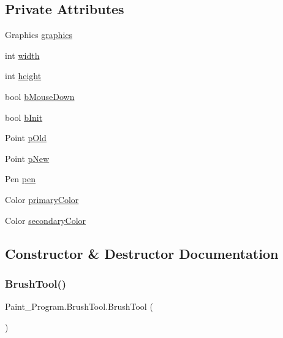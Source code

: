 \subsection*{Private Attributes}
\begin{DoxyCompactItemize}
\item 
Graphics \mbox{\hyperlink{class_paint___program_1_1_brush_tool_ada03533308b687fb5aad5a97e39a2418}{graphics}}
\item 
int \mbox{\hyperlink{class_paint___program_1_1_brush_tool_a2d11ac1381688670b77779849c220256}{width}}
\item 
int \mbox{\hyperlink{class_paint___program_1_1_brush_tool_a74fa3f15b3521feddeab58e5da3e794c}{height}}
\item 
bool \mbox{\hyperlink{class_paint___program_1_1_brush_tool_a38e63e44faf4b844b17525f6b64e166b}{b\+Mouse\+Down}}
\item 
bool \mbox{\hyperlink{class_paint___program_1_1_brush_tool_a3bf38746d897988af50ce9d863eaf70b}{b\+Init}}
\item 
Point \mbox{\hyperlink{class_paint___program_1_1_brush_tool_a2686971a90a27e64e904106fa8893841}{p\+Old}}
\item 
Point \mbox{\hyperlink{class_paint___program_1_1_brush_tool_a6d266f7303b546970257227c86dbacf7}{p\+New}}
\item 
Pen \mbox{\hyperlink{class_paint___program_1_1_brush_tool_a5346ef502ccfafa6f49ed704383a7fe5}{pen}}
\item 
Color \mbox{\hyperlink{class_paint___program_1_1_brush_tool_ab15d64ae81405a6edc9c0731975d2b8d}{primary\+Color}}
\item 
Color \mbox{\hyperlink{class_paint___program_1_1_brush_tool_ae5d888beaa07df91858d531a4a0bd5a5}{secondary\+Color}}
\end{DoxyCompactItemize}


\subsection{Constructor \& Destructor Documentation}
\mbox{\label{class_paint___program_1_1_brush_tool_aab33da2c4f8f8040ec6947ce6f2d4c74}} 
\subsubsection{\texorpdfstring{Brush\+Tool()}{BrushTool()}}
{\footnotesize\ttfamily Paint\+\_\+\+Program.\+Brush\+Tool.\+Brush\+Tool (\begin{DoxyParamCaption}{ }\end{DoxyParamCaption})\hspace{0.3cm}{\ttfamily [inline]}}



